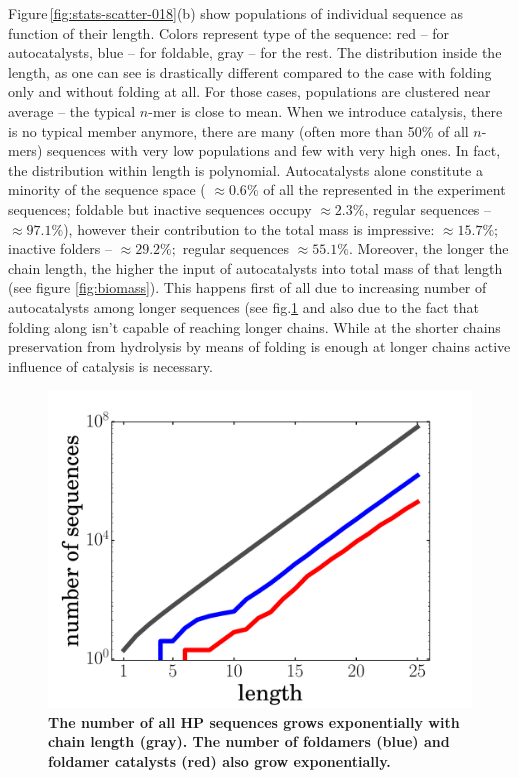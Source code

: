 \documentclass[journal=jacsat,manuscript=article,layout=twocolumn]{achemso}
\begin{document}
Figure\,\ref{fig:stats-scatter-018}(b) show populations of individual sequence as function of 
their 
length. Colors represent type of the sequence: red -- for autocatalysts, blue -- for foldable, 
gray 
-- for the rest. The distribution inside the length, as one can see is drastically different 
compared to the case with folding only and without folding at all. For those cases, populations 
are clustered near average -- the typical $n$-mer is close to mean. When we introduce catalysis, 
there is no typical member anymore, there are many (often more than  50\% of all $n$-mers) 
sequences with very low populations and few with very high ones. In fact, the distribution within 
length is polynomial. Autocatalysts alone constitute a minority of the sequence space ( 
$\approx 
0.6\%$ 
of all the represented in the experiment sequences; foldable but inactive sequences occupy 
$\approx 
2.3\%$, regular sequences -- $\approx97.1\%$), however their contribution to the total mass is 
impressive: 
$\approx 15.7\%$; inactive folders -- $\approx 29.2\%;$ regular sequences $\approx 55.1\%$. 
Moreover, the longer the chain length, the higher the input of autocatalysts into total mass of 
that length (see figure \ref{fig:biomass}). This happens first of all due to increasing number of 
autocatalysts among longer sequences (see fig.\ref{fig:hp-statistics} and also due to the fact 
that 
folding along isn't capable of reaching longer chains. While at the shorter chains preservation 
from hydrolysis by means of folding is enough at longer chains active influence of catalysis is 
necessary.
\begin{figure}[hbt!]
  \centering
  \includegraphics[width=\columnwidth]{pictures/hp-statistics.pdf} 
  \caption{\footnotesize{\textbf{The number of all HP sequences grows exponentially with chain 
length (gray).  The number of foldamers (blue) and foldamer catalysts (red) also grow 
exponentially.}}}
  \label{fig:hp-statistics}
\end{figure}
\end{document}
